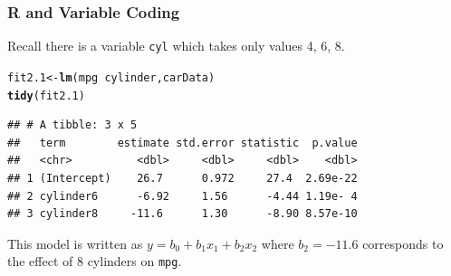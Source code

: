 \documentclass[12pt]{beamer}\usepackage[]{graphicx}\usepackage[]{color}
\makeatletter
\newcommand{\hlopt}[1]{\textcolor[rgb]{0,0,0}{#1}}%
\newcommand{\hlstd}[1]{\textcolor[rgb]{0.345,0.345,0.345}{#1}}%
\newcommand{\hlkwb}[1]{\textcolor[rgb]{0.69,0.353,0.396}{#1}}%
\newcommand{\hlkwc}[1]{\textcolor[rgb]{0.333,0.667,0.333}{#1}}%
\newcommand{\hlkwd}[1]{\textcolor[rgb]{0.737,0.353,0.396}{\textbf{#1}}}%
\newenvironment{kframe}{%
 \def\at@end@of@kframe{}%
 \ifinner\ifhmode%
  \def\at@end@of@kframe{\end{minipage}}%
  \begin{minipage}{\columnwidth}%
 \fi\fi%
 \def\FrameCommand##1{\hskip\@totalleftmargin \hskip-\fboxsep
 \colorbox{shadecolor}{##1}\hskip-\fboxsep
     \hskip-\linewidth \hskip-\@totalleftmargin \hskip\columnwidth}%
 \MakeFramed {\advance\hsize-\width
   \@totalleftmargin\z@ \linewidth\hsize
   \@setminipage}}%
 {\par\unskip\endMakeFramed%
 \at@end@of@kframe}
\newenvironment{knitrout}{}{} %
\makeatother
\begin{document}



\begin{frame}[fragile]
\frametitle{R and Variable Coding}
Recall there is a variable \texttt{cyl} which takes only values  4, 6, 8. 


\begin{knitrout}\small
{}\color{fgcolor}\begin{kframe}
\begin{alltt}
\hlstd{fit2.1} \hlkwb{<-} \hlkwd{lm}\hlstd{(mpg} \hlopt{~} \hlstd{cylinder, carData)}
\hlkwd{tidy}\hlstd{(fit2.1)}
\end{alltt}
\begin{verbatim}
## # A tibble: 3 x 5
##   term        estimate std.error statistic  p.value
##   <chr>          <dbl>     <dbl>     <dbl>    <dbl>
## 1 (Intercept)    26.7      0.972     27.4  2.69e-22
## 2 cylinder6      -6.92     1.56      -4.44 1.19e- 4
## 3 cylinder8     -11.6      1.30      -8.90 8.57e-10
\end{verbatim}
\end{kframe}
\end{knitrout}

This model is written as $y = b_0 + b_1x_1 + b_2x_2$ where $b_2=-11.6$ corresponds to the effect of 8 cylinders on \texttt{mpg}.
\end{frame}

\end{document}
